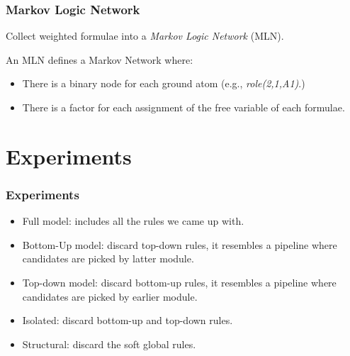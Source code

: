 \documentclass{beamer} \setbeamertemplate{navigation symbols}{}
\begin{document}
\begin{frame}
  \frametitle{Markov Logic Network}
  Collect weighted formulae into a \emph{Markov Logic Network} (MLN).

  An MLN defines a Markov Network where:
  \begin{itemize}
  \item There is a binary node for each ground atom (e.g.,
    \emph{role(2,1,A1)}.)
  \item There is a factor for each assignment of the free variable of
    each formulae.
  \end{itemize}



\end{frame}

\section{Experiments}
\begin{frame}
  \frametitle{Experiments}

  \begin{itemize}
  \item Full model: includes all the rules we came up with.
  \item Bottom-Up model: discard top-down rules, it resembles a
    pipeline where candidates are picked by latter module.
  \item Top-down model: discard bottom-up rules, it resembles a
    pipeline where candidates are picked by earlier module.
  \item Isolated: discard bottom-up and top-down rules.
  \item Structural: discard the soft global rules.
  \end{itemize}
\end{frame}
\end{document}
